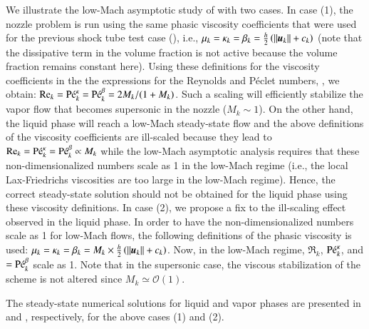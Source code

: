 %
We illustrate the low-Mach asymptotic study of  with two cases. 
%
In case (1), the nozzle problem is run using the same phasic viscosity 
coefficients that were used for the previous shock tube test case (), i.e., 
$\mu_k =  \kappa_k = \beta_k = \tfrac{h}{2} \left( ||\boldsymbol u_k|| + c_k \right)$ 
(note that the dissipative term in the volume fraction is not active because the volume fraction remains constant here). 
Using these definitions for the viscosity coefficients in the the expressions for the Reynolds and P\'eclet numbers, , 
we obtain: $\textrm{Re}_k=\textrm{P\'e}_k^\kappa=\textrm{P\'e}_k^\beta = 2M_k / (1+M_k)$. 
Such a scaling will efficiently stabilize the vapor flow that becomes supersonic in the nozzle ($M_k \sim 1 $). On the other hand, the liquid phase will reach 
a low-Mach steady-state flow and the above definitions of the viscosity coefficients are ill-scaled because they lead to $\textrm{Re}_k=\textrm{P\'e}_k^\kappa=\textrm{P\'e}_k^\beta \propto M_k$ 
while the low-Mach asymptotic analysis requires that these non-dimensionalized numbers scale as 1 in the low-Mach regime (i.e., 
the local Lax-Friedrichs viscosities are too large in the low-Mach regime). Hence, the correct steady-state solution
should not be obtained for the liquid phase using these viscosity definitions. 
%
In case (2), we propose a fix to the ill-scaling effect observed in the liquid phase. In order to have the non-dimensionalized numbers scale as 1
for low-Mach flows, the following definitions of the phasic viscosity is used:  $\mu_k =  \kappa_k = \beta_k = M_k \times \tfrac{h}{2} \left( ||\boldsymbol u_k|| + c_k \right)$. 
Now, in the low-Mach regime, $\Re_k$, $\textrm{P\'e}_k^\kappa$, and $=\textrm{P\'e}_k^\beta$ scale as 1. Note that in the supersonic case, the 
viscous stabilization of the scheme is not altered since $M_k \simeq \mathcal{O}(1)$. 

The steady-state numerical solutions for liquid and vapor phases are presented in  and , respectively, 
for the above cases (1) and (2).

